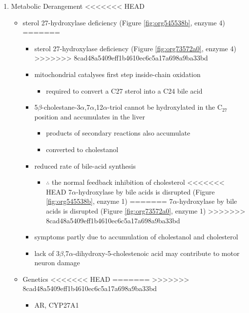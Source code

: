 \documentclass{scrartcl}
\begin{document}
\begin{itemize}
\begin{enumerate}
\begin{enumerate}
\begin{enumerate}
\begin{itemize}
\begin{enumerate}
\begin{enumerate}
\item Metabolic Derangement
<<<<<<< HEAD
\label{sec:orgafb4a1f}
\begin{itemize}
\item sterol 27-hydroxylase deficiency (Figure \ref{fig:org545538b}, enzyme 4)
=======
\label{sec:orgc6903ae}
\begin{itemize}
\item sterol 27-hydroxylase deficiency (Figure \ref{fig:org73572a0}, enzyme 4)
>>>>>>> 8cad48a5409eff1b4610ec6c5a17a698a9ba33bd
\item mitochondrial catalyses first step inside-chain oxidation
\begin{itemize}
\item required to convert a C27 sterol into a C24 bile acid
\end{itemize}
\item 5\(\beta\)-cholestane-3\(\alpha\),7\(\alpha\),12\(\alpha\)-triol cannot be hydroxylated in the C\(_{\text{27}}\)
position and accumulates in the liver
\begin{itemize}
\item products of secondary reactions also accumulate
\item converted to cholestanol
\end{itemize}
\item reduced rate of bile-acid synthesis
\begin{itemize}
\item \(\therefore\) the normal feedback inhibition of cholesterol
<<<<<<< HEAD
7\(\alpha\)-hydroxylase by bile acids is disrupted (Figure \ref{fig:org545538b}, enzyme 1)
=======
7\(\alpha\)-hydroxylase by bile acids is disrupted (Figure \ref{fig:org73572a0}, enzyme 1)
>>>>>>> 8cad48a5409eff1b4610ec6c5a17a698a9ba33bd
\end{itemize}
\item symptoms partly due to accumulation of cholestanol and cholesterol
\item lack of 3\(\beta\),7\(\alpha\)-dihydroxy-5-cholestenoic acid may contribute to motor
neuron damage
\end{itemize}

\item Genetics
<<<<<<< HEAD
\label{sec:orgd5f3115}
=======
\label{sec:orgb3175a3}
>>>>>>> 8cad48a5409eff1b4610ec6c5a17a698a9ba33bd
\begin{itemize}
\item AR, CYP27A1
\end{itemize}


\end{itemize}
\end{enumerate}
\end{enumerate}
\end{itemize}
\end{enumerate}
\end{enumerate}
\end{enumerate}
\end{itemize}
\end{document}
